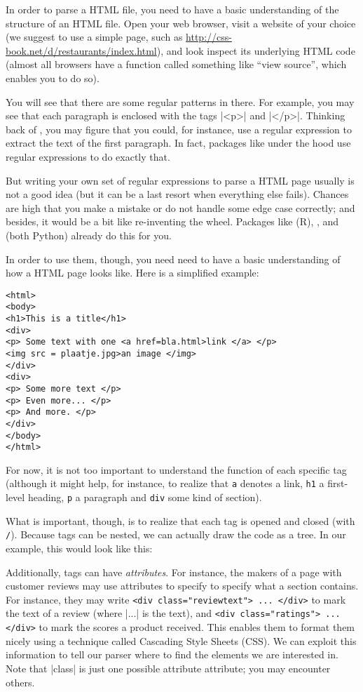 In order to parse a HTML file, you need to have a basic understanding
of the structure of an HTML file. Open your web browser, visit a
website of your choice (we suggest to use a simple page, such as
\url{http://css-book.net/d/restaurants/index.html}), and
look inspect its underlying HTML code (almost all browsers have a
function called something like ``view source'', which enables you to
do so).

You will see that there are some regular patterns in there. For
example, you may see that each paragraph is enclosed with the tags
|<p>| and |</p>|. Thinking back of , you may figure
that you could, for instance, use a regular expression to extract
the text of the first paragraph. In fact, packages like 
under the hood use regular expressions to do exactly that.

But writing your own set of regular expressions to parse a HTML
page usually is not a good idea (but it can be a last resort when
everything else fails). Chances are high that you make
a mistake or do not handle some edge case correctly; and besides,
it would be a bit like re-inventing the wheel. Packages like
 (R), , and  (both Python)
already do this for you.

In order to use them, though, you need need to have a basic
understanding of how a HTML page looks like. Here is a simplified
example:

\begin{lstlisting}
<html>
<body>
<h1>This is a title</h1>
<div>
<p> Some text with one <a href=bla.html>link </a> </p>
<img src = plaatje.jpg>an image </img>
</div>
<div>
<p> Some more text </p>
<p> Even more... </p>
<p> And more. </p>
</div>
</body>
</html>
\end{lstlisting}

For now, it is not too important to understand the function of each
specific tag (although it might help, for instance, to realize that
\texttt{a} denotes a link, \texttt{h1} a first-level heading,
\texttt{p} a paragraph and \texttt{div} some kind of section).

What is important, though, is to realize that each tag is opened and
closed (with \texttt{/}). Because tags can be nested, we can actually
draw the code as a tree. In our example, this would look like this:



Additionally, tags can have \emph{attributes}. For instance, the
makers of a page with customer reviews may use attributes to specify
to specify what a section contains. For instance, they may write
\texttt{<div class="reviewtext"> ... </div>}  to mark the text of a review (where
|...| is the text), and \texttt{<div class="ratings"> ...</div>} to mark the
scores a product received. This enables them to format them nicely
using a technique called Cascading Style Sheets (CSS). We can exploit
this information to tell our parser where to find the elements we
are interested in. Note that |class| is just one possible attribute
attribute; you may encounter others.

